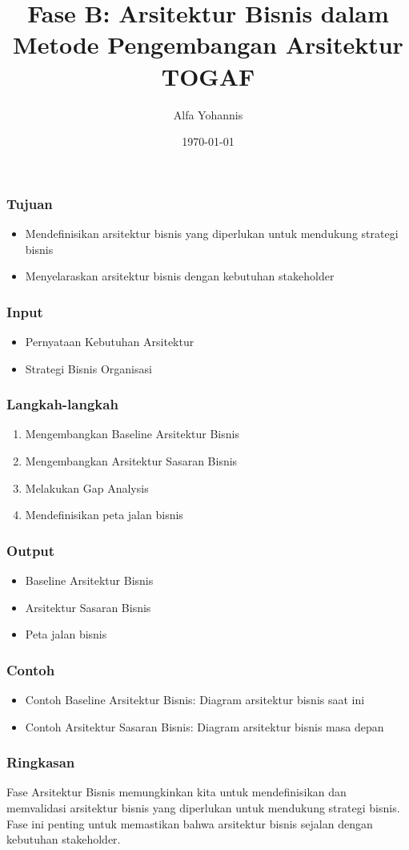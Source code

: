 \documentclass{beamer}
\title{Fase B: Arsitektur Bisnis dalam Metode Pengembangan Arsitektur TOGAF}
\author{Alfa Yohannis}
\date{\today}
\begin{document}
\frame{\titlepage}

\begin{frame}
\frametitle{Tujuan}
\begin{itemize}
\item Mendefinisikan arsitektur bisnis yang diperlukan untuk mendukung strategi bisnis
\item Menyelaraskan arsitektur bisnis dengan kebutuhan stakeholder
\end{itemize}
\end{frame}

\begin{frame}
\frametitle{Input}
\begin{itemize}
\item Pernyataan Kebutuhan Arsitektur
\item Strategi Bisnis Organisasi
\end{itemize}
\end{frame}

\begin{frame}
\frametitle{Langkah-langkah}
\begin{enumerate}
\item Mengembangkan Baseline Arsitektur Bisnis
\item Mengembangkan Arsitektur Sasaran Bisnis
\item Melakukan Gap Analysis
\item Mendefinisikan peta jalan bisnis
\end{enumerate}
\end{frame}

\begin{frame}
\frametitle{Output}
\begin{itemize}
\item Baseline Arsitektur Bisnis
\item Arsitektur Sasaran Bisnis
\item Peta jalan bisnis
\end{itemize}
\end{frame}

\begin{frame}
\frametitle{Contoh}
\begin{itemize}
\item Contoh Baseline Arsitektur Bisnis: Diagram arsitektur bisnis saat ini
\item Contoh Arsitektur Sasaran Bisnis: Diagram arsitektur bisnis masa depan
\end{itemize}
\end{frame}

\begin{frame}
\frametitle{Ringkasan}
Fase Arsitektur Bisnis memungkinkan kita untuk mendefinisikan dan memvalidasi arsitektur bisnis yang diperlukan untuk mendukung strategi bisnis. Fase ini penting untuk memastikan bahwa arsitektur bisnis sejalan dengan kebutuhan stakeholder.
\end{frame}
\end{document}
